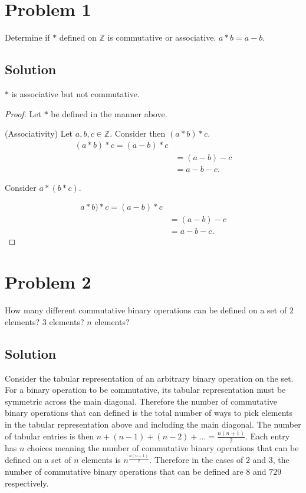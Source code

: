 \documentclass[12pt]{extarticle}
\begin{document}
\section*{Problem 1}
Determine if $*$ defined on $\mathbb{Z}$ is commutative or associative. $a * b = a - b$.
\subsection*{Solution}

$*$ is associative but not commutative.

\begin{proof}
	Let $*$ be defined in the manner above. \\
	\qquad\begin{minipage}{\dimexpr\textwidth-2cm}
		(Associativity) \quad Let $a,b,c \in \mathbb{Z}$. Consider then $(a * b) * c$. 
		\begin{align*}
			(a * b) * c = (a - b) * c \\ 
			&= (a - b) - c \\ 
			&= a - b - c
		.\end{align*}

		Consider $a * (b * c)$. 
		
		\begin{align*}
			a * b) * c = (a - b) * c \\ 
			&= (a - b) - c \\ 
			&= a - b - c
		.\end{align*}
	\end{minipage}
\end{proof}

\section*{Problem 2}
How many different commutative binary operations can be defined on a set of $2$ elements? $3$ elements? $n$ elements?
\subsection*{Solution}
Consider the tabular representation of an arbitrary binary operation on the set. For a binary operation to be commutative, its tabular representation must be symmetric across the main diagonal. Therefore the number of commutative binary operations that can defined is the total number of ways to pick elements in the tabular representation above and including the main diagonal. The number of tabular entries is then $n + (n-1) + (n-2) + \ldots = \frac{n(n+1)}{2}$. Each entry has $n$ choices meaning the number of commutative binary operations that can be defined on a set of $n$ elements is $n^{\frac{n(n+1)}{2}}$. Therefore in the cases of $2$ and $3$, the number of commutative binary operations that can be defined are $8$ and $729$ respectively.
\end{document}
